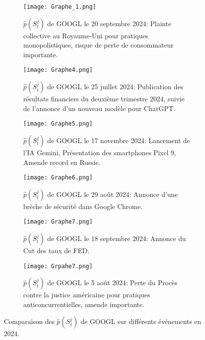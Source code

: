 \documentclass[12pt,a4paper]{article}
\theoremstyle{definition}
\theoremstyle{remark}
\begin{document}
\begin{figure}[h!]
    \centering
    \begin{subfigure}[b]{0.48\textwidth}
        \centering
        \texttt{[image: Graphe\_1.png]}
        \caption{$\hat{p}(S_t^j)$ de GOOGL le 20 septembre 2024: Plainte collective au Royaume-Uni pour pratiques monopolistiques, risque de perte de consommateur importante.}
        \label{fig:trades1}
    \end{subfigure}
    \hfill
    \begin{subfigure}[b]{0.48\textwidth}
        \centering
        \texttt{[image: Graphe4.png]}
        \caption{$\hat{p}(S_t^j)$ de GOOGL le 25 juillet 2024: Publication des résultats financiers du deuxième trimestre 2024, suivie de l'annonce d'un nouveau modèle pour ChatGPT.}
        \label{fig:trades2}
    \end{subfigure}

    \begin{subfigure}[b]{0.48\textwidth}
        \centering
        \texttt{[image: Graphe5.png]}
        \caption{$\hat{p}(S_t^j)$ de GOOGL le 17 novembre 2024: Lancement de l'IA Gemini, Présentation des smartphones Pixel 9, Amende record en Russie.}
        \label{fig:trades3}
    \end{subfigure}
    \hfill
    \begin{subfigure}[b]{0.48\textwidth}
        \centering
        \texttt{[image: Graphe6.png]}
        \caption{$\hat{p}(S_t^j)$ de GOOGL le 29 août 2024: Annonce d'une brèche de sécurité dans Google Chrome.}
        \label{fig:trades4}
    \end{subfigure}

    \begin{subfigure}[b]{0.48\textwidth}
        \centering
        \texttt{[image: Graphe7.png]}
        \caption{$\hat{p}(S_t^j)$ de GOOGL le 18 septembre 2024: Annonce du Cut des taux de FED.}
        \label{fig:trades5}
    \end{subfigure}
    \hfill
    \begin{subfigure}[b]{0.48\textwidth}
        \centering
        \texttt{[image: Grpahe7.png]}
        \caption{$\hat{p}(S_t^j)$ de GOOGL le 5 août 2024: Perte du Procès contre la justice américaine pour pratiques anticoncurrentielles, amende importante.}
        \label{fig:trades6}
    \end{subfigure}

    \caption{Comparaison des $\hat{p}(S_t^j)$ de GOOGL sur différents événements en 2024.}
    \label{fig:comparison}
\end{figure}
\end{document}
